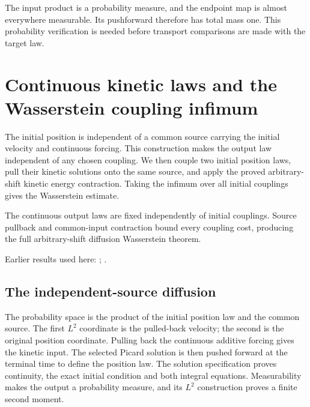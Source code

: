 \documentclass[11pt,a4paper]{report}
\begin{document}
The input product is a probability measure, and the endpoint map is almost everywhere measurable. Its pushforward therefore has total mass one. This probability verification is needed before transport comparisons are made with the target law.

\section{\texorpdfstring{Continuous kinetic laws and the Wasserstein coupling infimum}{Continuous kinetic laws and the Wasserstein coupling infimum}}
\label{proof-module-KineticLangevin-ProductContinuousFlow-lean}


The initial position is independent of a common source carrying the initial velocity and continuous forcing. This construction makes the output law independent of any chosen coupling. We then couple two initial position laws, pull their kinetic solutions onto the same source, and apply the proved arbitrary-shift kinetic energy contraction. Taking the infimum over all initial couplings gives the Wasserstein estimate.



The continuous output laws are fixed independently of initial couplings. Source pullback and common-input contraction bound every coupling cost, producing the full arbitrary-shift diffusion Wasserstein theorem.



Earlier results used here: \cite[Section~3.21]{LangevinLean2026ULASC}; \cite[Section~3.18]{LangevinLean2026ULASC}.
\subsection{\texorpdfstring{The independent-source diffusion}{The independent-source diffusion}}
\label{report-step-KineticLangevin-ProductContinuousFlow-lean-1}


The probability space is the product of the initial position law and the common source. The first \(L^{2}\) coordinate is the pulled-back velocity; the second is the original position coordinate. Pulling back the continuous additive forcing gives the kinetic input. The selected Picard solution is then pushed forward at the terminal time to define the position law. The solution specification proves continuity, the exact initial condition and both integral equations. Measurability makes the output a probability measure, and its \(L^{2}\) construction proves a finite second moment.
\end{document}
